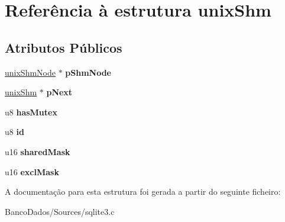 \hypertarget{structunix_shm}{\section{Referência à estrutura unix\-Shm}
\label{structunix_shm}
}
\subsection*{Atributos Públicos}
\begin{DoxyCompactItemize}
\item 
\hypertarget{structunix_shm_a8ab421232d29e3237262ef46775199ee}{\hyperlink{structunix_shm_node}{unix\-Shm\-Node} $\ast$ {\bfseries p\-Shm\-Node}}\label{structunix_shm_a8ab421232d29e3237262ef46775199ee}

\item 
\hypertarget{structunix_shm_a0d5229cf734581f51cdf16dd7d5ce93a}{\hyperlink{structunix_shm}{unix\-Shm} $\ast$ {\bfseries p\-Next}}\label{structunix_shm_a0d5229cf734581f51cdf16dd7d5ce93a}

\item 
\hypertarget{structunix_shm_a43903be262472299c5eee917ba7c523c}{u8 {\bfseries has\-Mutex}}\label{structunix_shm_a43903be262472299c5eee917ba7c523c}

\item 
\hypertarget{structunix_shm_a88a5e7161ff31f85740dbfc0ba7ad38a}{u8 {\bfseries id}}\label{structunix_shm_a88a5e7161ff31f85740dbfc0ba7ad38a}

\item 
\hypertarget{structunix_shm_a768aa62a6ea2bd91ab60a34d7654811b}{u16 {\bfseries shared\-Mask}}\label{structunix_shm_a768aa62a6ea2bd91ab60a34d7654811b}

\item 
\hypertarget{structunix_shm_ac6f786d95952e51cab941cbfb9243c8e}{u16 {\bfseries excl\-Mask}}\label{structunix_shm_ac6f786d95952e51cab941cbfb9243c8e}

\end{DoxyCompactItemize}


A documentação para esta estrutura foi gerada a partir do seguinte ficheiro\-:\begin{DoxyCompactItemize}
\item 
Banco\-Dados/\-Sources/sqlite3.\-c\end{DoxyCompactItemize}
